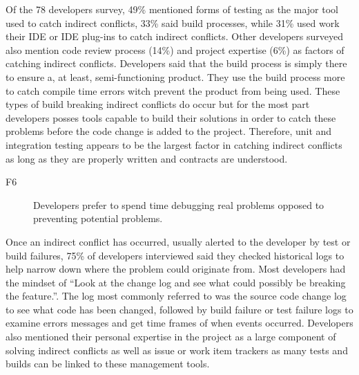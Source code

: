 \documentclass[conference]{IEEEtran}
\makeatletter
\def\namedlabel#1#2{\begingroup
   \def\@currentlabel{#2}%
   \label{#1}\endgroup
}
\makeatother
\begin{document}
Of the 78 developers survey, 49\% mentioned forms of testing as the major tool used to catch indirect conflicts, 33\% said build processes,
while 31\% used work their IDE or IDE plug-ins to catch indirect conflicts. Other developers surveyed also mention code review process (14\%)
and project expertise (6\%) as factors of catching indirect conflicts. 
Developers said that the build process is simply there to ensure a, at least, semi-functioning product. They use
the build process more to catch compile time errors witch prevent the product from being used. These types of build breaking indirect
conflicts do occur but for the most part developers posses tools capable to build their solutions in order to catch these problems before
the code change is added to the project. Therefore, unit and integration testing appears to be the largest factor in catching indirect conflicts
as long as they are properly written and contracts are understood.

\begin{description}
	\item[F6\namedlabel{itm:f6}{F6}] Developers prefer to spend time debugging real problems opposed to preventing potential problems.
\end{description}

Once an indirect conflict has occurred, usually alerted to the developer by test or build failures, 75\% of developers interviewed said
they checked historical logs to help narrow down where the problem could originate from. Most developers had the mindset of
``Look at the change log and see what could possibly be breaking the feature.''. The log most commonly referred to was the source
code change log to see what code has been changed, followed by build failure or test failure logs to examine errors messages and get time 
frames of when events occurred. Developers also mentioned their personal expertise in the project as a large component of solving indirect
conflicts as well as issue or work item trackers as many tests and builds can be linked to these management tools.
\end{document}
